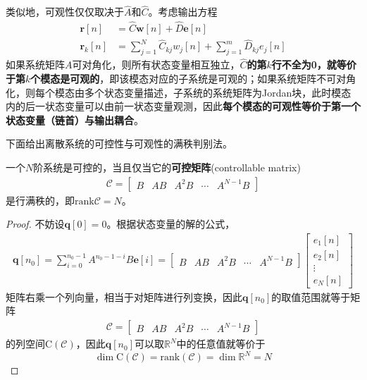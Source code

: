 类似地，可观性仅仅取决于$\hat{A}$和$\hat{C}$。考虑输出方程\begin{align*}
    \mathbf{r}[n]&=\hat{C}\mathbf{w}[n]+\hat{D}\mathbf{e}[n]\\
    \mathbf{r}_k[n]&=\sum_{j=1}^N \hat{C}_{kj} w_j[n]+\sum_{j=1}^m \hat{D}_{kj} e_j[n]
\end{align*}
如果系统矩阵$A$可对角化，则所有状态变量相互独立，\textbf{$\hat{C}$的第$k$行不全为0，就等价于第$k$个模态是可观的}，即该模态对应的子系统是可观的；如果系统矩阵不可对角化，则每个模态由多个状态变量描述，子系统的系统矩阵为Jordan块，此时模态内的后一状态变量可以由前一状态变量观测，因此\textbf{每个模态的可观性等价于第一个状态变量（链首）与输出耦合}。

下面给出离散系统的可控性与可观性的满秩判别法。

\begin{theorem}[可控性的满秩判别法]
    一个$N$阶系统是可控的，当且仅当它的\textbf{可控矩阵}(controllable matrix)
    \begin{align*}
    \mathcal{C} =\begin{bmatrix}
    B & AB & A^2B & \cdots & A^{N-1}B
    \end{bmatrix}
    \end{align*}
    是行满秩的，即$\mathrm{rank}\mathcal{C}=N$。
\end{theorem}
\begin{proof}
    不妨设$\mathbf{q}[0]=0$。根据状态变量的解的公式，\begin{align*}
        \mathbf{q}[n_0]=\sum_{i=0}^{n_0-1}A^{n_0-1-i}B\mathbf{e}[i]=\begin{bmatrix}
            B & AB & A^2B & \cdots & A^{N-1}B
        \end{bmatrix}\begin{bmatrix}
            e_1[n]\\
            e_2[n]\\
            \vdots\\
            e_N[n]
        \end{bmatrix}
    \end{align*}
    矩阵右乘一个列向量，相当于对矩阵进行列变换，因此$\mathbf{q}[n_0]$的取值范围就等于矩阵\begin{align*}
    \mathcal{C} =\begin{bmatrix}
    B & AB & A^2B & \cdots & A^{N-1}B
    \end{bmatrix}
    \end{align*}
    的列空间$\mathrm{C}(\mathcal{C})$，因此$\mathbf{q}[n_0]$可以取$\mathbb{R}^N$中的任意值就等价于
    $$\dim \mathrm{C}(\mathcal{C} )=\mathrm{rank}(\mathcal{C} )=\dim\mathbb{R}^N=N$$
\end{proof}

